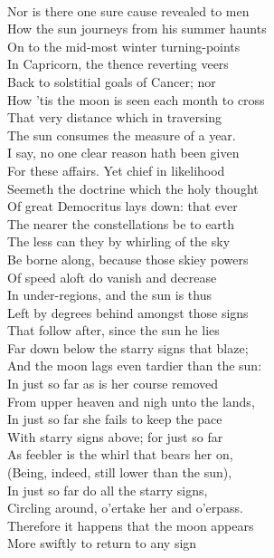 \\
Nor is there one sure cause revealed to men\\
How the sun journeys from his summer haunts\\
On to the mid-most winter turning-points\\
In Capricorn, the thence reverting veers\\
Back to solstitial goals of Cancer; nor\\
How 'tis the moon is seen each month to cross\\
That very distance which in traversing\\
The sun consumes the measure of a year.\\
I say, no one clear reason hath been given\\
For these affairs. Yet chief in likelihood\\
Seemeth the doctrine which the holy thought\\
Of great Democritus lays down: that ever\\
The nearer the constellations be to earth\\
The less can they by whirling of the sky\\
Be borne along, because those skiey powers\\
Of speed aloft do vanish and decrease\\
In under-regions, and the sun is thus\\
Left by degrees behind amongst those signs\\
That follow after, since the sun he lies\\
Far down below the starry signs that blaze;\\
And the moon lags even tardier than the sun:\\
In just so far as is her course removed\\
From upper heaven and nigh unto the lands,\\
In just so far she fails to keep the pace\\
With starry signs above; for just so far\\
As feebler is the whirl that bears her on,\\
(Being, indeed, still lower than the sun),\\
In just so far do all the starry signs,\\
Circling around, o'ertake her and o'erpass.\\
Therefore it happens that the moon appears\\
More swiftly to return to any sign\\
